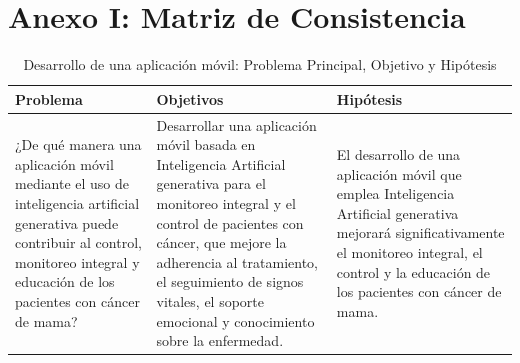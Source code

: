 \chapter{Anexo I: Matriz de Consistencia}

\begin{table}[htbp]
\centering
\small
\begin{tabular}{|p{5cm}|p{5cm}|p{5cm}|}
\hline
\textbf{Problema} & \textbf{Objetivos} & \textbf{Hipótesis} \\
\hline
¿De qué manera una aplicación móvil mediante el uso de inteligencia artificial generativa puede contribuir al control, monitoreo integral y educación de los pacientes con cáncer de mama? 
& Desarrollar una aplicación móvil basada en Inteligencia Artificial generativa para el monitoreo integral y el control de pacientes con cáncer, que mejore la adherencia al tratamiento, el seguimiento de signos vitales, el soporte emocional y conocimiento sobre la enfermedad. 
& El desarrollo de una aplicación móvil que emplea Inteligencia Artificial generativa mejorará significativamente el monitoreo integral, el control y la educación de los pacientes con cáncer de mama. \\
\hline
\end{tabular}
\caption{Desarrollo de una aplicación móvil: Problema Principal, Objetivo y Hipótesis}
\label{tabla_principal}
\end{table}

